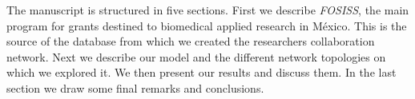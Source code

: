 \documentclass[11pt]{article}
\begin{document}
The manuscript is structured in five sections. First we describe
\textit{FOSISS}, the main program for grants destined to biomedical applied
research in M\'exico. This is the source of the
database from which we created the researchers collaboration network. Next we
describe our model
and the different network topologies on which we explored it.
We then present our results and discuss them. In the last section
we draw some final remarks and conclusions.








\end{document}
